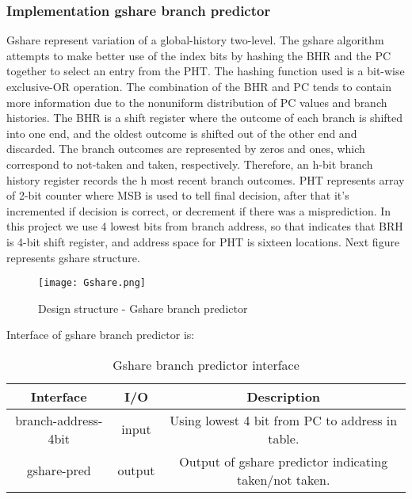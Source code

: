\documentclass{scrreprt}
\begin{document}
\subsubsection*{Implementation gshare branch predictor}
Gshare represent variation of a global-history two-level. The gshare algorithm attempts to make better use of the index bits by hashing the BHR and the PC together to select an entry from the PHT. The hashing function used is a bit-wise exclusive-OR operation. The combination of the BHR and PC tends to contain more information due to the nonuniform distribution of PC values and branch histories.
The BHR is a shift register where the outcome of each branch is shifted into one end, and the oldest outcome is shifted out of the other end and discarded. The branch outcomes are represented by zeros and ones, which correspond to not-taken and taken, respectively. Therefore, an h-bit branch history register records the h most recent branch outcomes.
PHT represents array of 2-bit counter where MSB is used to tell final decision, after that it's incremented if decision is correct, or decrement if there was a misprediction.
In this project we use 4 lowest bits from branch address, so that indicates that BRH is 4-bit shift register, and address space for PHT is sixteen locations. 
\newline
Next figure represents gshare structure. 
\begin{figure}[htb!]
    \centering
    \texttt{[image: Gshare.png]}
    \caption{Design structure - Gshare branch predictor}
    \label{fig:Gshare}
\end{figure}
\newline
\newline
\newline
\newline
Interface of gshare branch predictor is:
\begin{table}[htb!]
            \centering
            \begin{tabular}{|c|c|c|} \hline 
             Interface & I/O & Description \\ \hline  
             branch-address-4bit & input & Using lowest 4 bit from PC to address in table. \\ \hline  
             gshare-pred & output & Output of gshare predictor indicating taken/not taken.  \\ \hline
        \end{tabular}
        \caption{Gshare branch predictor interface}
        \label{tab:GshareI}
    \end{table}
\end{document}
